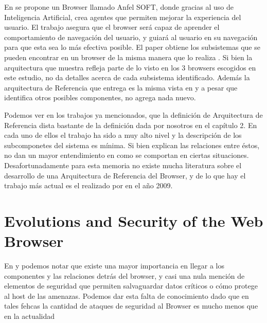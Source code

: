 En \cite{Lwin2009} se propone un Browser llamado Anfel SOFT, donde gracias al uso de Inteligencia Artificial, crea agentes que permiten mejorar la experiencia del usuario. El trabajo asegura que el browser será capaz de aprender el comportamiento de navegación del usuario, y guiará al usuario en su navegación para que esta sea lo más efectiva posible. El paper obtiene los subsistemas que se pueden encontrar en un browser de la misma manera que lo realiza \cite{2005-grosskurth-browser-refarch}. Si bien la arquitectura que muestra refleja parte de lo visto en los 3 browsers escogidos en este estudio, no da detalles acerca de cada subsistema identificado. Además la arquitectura de Referencia que entrega es la misma vista en \cite{2005-grosskurth-browser-refarch, preprint-grosskurth-browser-archevol} y a pesar que identifica otros posibles componentes, no agrega nada nuevo.

Podemos ver en los trabajos ya mencionados, que la definición de Arquitectura de Referencia dista bastante de la definición dada por nosotros en el capítulo 2. En cada uno de ellos el trabajo ha sido a muy alto nivel y la descripción de los subcomponetes del sistema es mínima. Si bien explican las relaciones entre éstos, no dan un mayor entendimiento en como se comportan en ciertas situaciones. Desafortunadamente para esta memoria no existe mucha literatura sobre el desarrollo de una Arquitectura de Referencia del Browser, y de lo que hay el trabajo más actual es el realizado por \cite{Lwin2009} en el año 2009.




\section{Evolutions and Security of the Web Browser}
\label{chap3:EvoandSec}

En \cite{2005-grosskurth-browser-refarch} y \cite{preprint-grosskurth-browser-archevol} podemos notar que existe una mayor importancia en llegar a los componentes y las relaciones detrás del browser, y casi una nula mención de elementos de seguridad que permiten salvaguardar datos críticos o cómo protege al host de las amenazas. Podemos dar esta falta de conocimiento dado que en tales fehcas la cantidad de ataques de seguridad al Browser es mucho menos que en la actualidad %


